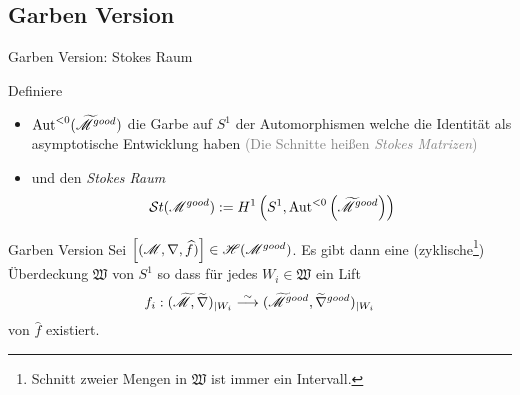 \subsection{Garben Version}
\begin{frame}[t]{Garben Version: Stokes Raum}
  \begin{defn}
    Definiere
    \begin{itemize}
      \item $\operatorname{Aut}^{<0}(\widetilde{\mathscr{M}}^{good})$
        die Garbe auf $S^1$ der Automorphismen welche die Identität als
        asymptotische Entwicklung haben
        \textcolor{gray}{(Die Schnitte heißen \emph{Stokes Matrizen})}
      \item<2-3> und den \emph{Stokes Raum}
        \[
          \mathcal{S}{}t(\mathscr{M}^{good})
          :=H^1\left(S^1,\operatorname{Aut}^{<0}\left(\widetilde {\mathscr{M}}^{good}\right)\right)
        \]
    \end{itemize}
  \end{defn}
\end{frame}
\begin{frame}[t]{Garben Version}
  Sei $\left[(\mathscr{M},\nabla,\widehat f)\right]\in\mathscr{H}(\mathscr{M}^{good})$.  Es gibt dann eine
  (zyklische\footnote{Schnitt zweier Mengen in $\mathfrak{W}$ ist immer ein
  Intervall.}) Überdeckung $\mathfrak{W}$ von $S^1$ so dass für jedes
  $W_i\in\mathfrak{W}$ ein Lift
  \[
    f_i:(\widetilde{\mathscr{M}},\widetilde\nabla)_{|W_i}
    \overset{\sim}{\longrightarrow}
    (\widetilde{\mathscr{M}}^{good},\widetilde\nabla^{good})_{|W_i}
  \]
  von $\hat f$ existiert.
\end{frame}

